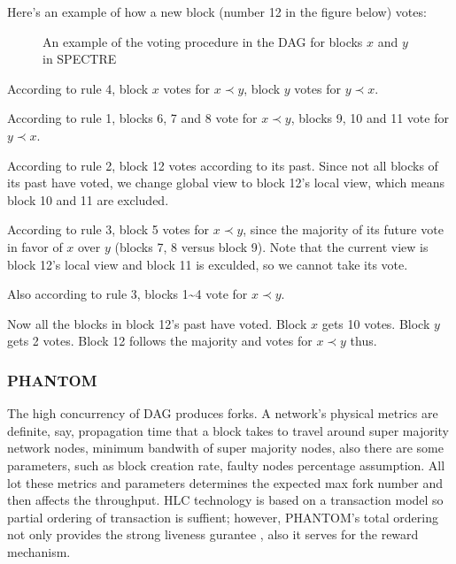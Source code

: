 \documentclass[a4paper,11pt]{article}
\begin{document}
Here's an example of how a new block (number 12 in the figure below) votes:

\begin{figure}[h]
	\centerline{%
	}
\caption{An example of the voting procedure in the DAG for blocks $x$ and $y$ in SPECTRE}
\end{figure}

According to rule 4, block $x$ votes for $x \prec y$, block $y$ votes for $y
\prec x$.

According to rule 1, blocks 6, 7 and 8 vote for $x \prec y$, blocks 9, 10 and 11
vote for $y \prec x$.

According to rule 2, block 12 votes according to its past. Since not all blocks
of its past have voted, we change global view to block 12's local view, which
means block 10 and 11 are excluded.

According to rule 3, block 5 votes for $x \prec y$, since the majority of its
future vote in favor of $x$ over $y$ (blocks 7, 8 versus block 9). Note that the
current view is block 12's local view and block 11 is exculded, so we cannot
take its vote.

Also according to rule 3, blocks 1\textasciitilde4 vote for $x \prec y$.

Now all the blocks in block 12's past have voted. Block $x$ gets 10 votes. Block
$y$ gets 2 votes. Block 12 follows the majority and votes for $x \prec y$ thus.


\subsubsection*{PHANTOM}
The high concurrency of DAG produces forks. A network's physical metrics are definite, say, propagation time that a block takes to travel around super majority network nodes, minimum bandwith of super majority nodes, also there are some parameters, such as block creation rate, faulty nodes percentage assumption. All lot these metrics and parameters determines the expected max fork number and then affects the throughput. HLC technology is based on a transaction model so partial ordering of transaction is suffient; however, PHANTOM's total ordering not only provides the strong liveness gurantee , also it serves for the reward mechanism.
\end{document}
